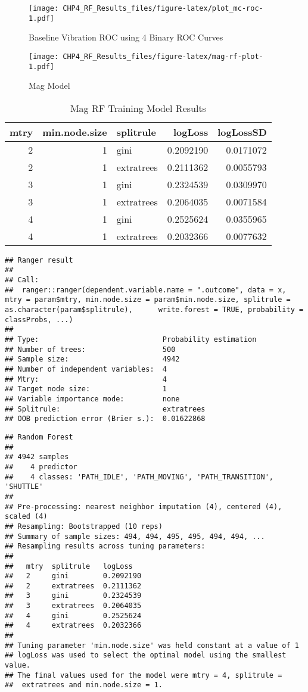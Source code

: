 \documentclass[]{article}
\begin{document}
\begin{figure}
\centering
\texttt{[image: CHP4\_RF\_Results\_files/figure-latex/plot\_mc-roc-1.pdf]}
\caption{Baseline Vibration ROC using 4 Binary ROC Curves}
\end{figure}

\begin{figure}
\centering
\texttt{[image: CHP4\_RF\_Results\_files/figure-latex/mag-rf-plot-1.pdf]}
\caption{Mag Model}
\end{figure}

\begin{table}[!h]

\caption{\label{tab:mag-rf-params}Mag RF Training Model Results}
\centering
\begin{tabular}[t]{rrlrr}
\toprule
mtry & min.node.size & splitrule & logLoss & logLossSD\\
\midrule
2 & 1 & gini & 0.2092190 & 0.0171072\\
2 & 1 & extratrees & 0.2111362 & 0.0055793\\
3 & 1 & gini & 0.2324539 & 0.0309970\\
3 & 1 & extratrees & 0.2064035 & 0.0071584\\
4 & 1 & gini & 0.2525624 & 0.0355965\\
4 & 1 & extratrees & 0.2032366 & 0.0077632\\
\bottomrule
\end{tabular}
\end{table}

\begin{verbatim}
## Ranger result
## 
## Call:
##  ranger::ranger(dependent.variable.name = ".outcome", data = x,      mtry = param$mtry, min.node.size = param$min.node.size, splitrule = as.character(param$splitrule),      write.forest = TRUE, probability = classProbs, ...) 
## 
## Type:                             Probability estimation 
## Number of trees:                  500 
## Sample size:                      4942 
## Number of independent variables:  4 
## Mtry:                             4 
## Target node size:                 1 
## Variable importance mode:         none 
## Splitrule:                        extratrees 
## OOB prediction error (Brier s.):  0.01622868
\end{verbatim}

\begin{verbatim}
## Random Forest 
## 
## 4942 samples
##    4 predictor
##    4 classes: 'PATH_IDLE', 'PATH_MOVING', 'PATH_TRANSITION', 'SHUTTLE' 
## 
## Pre-processing: nearest neighbor imputation (4), centered (4), scaled (4) 
## Resampling: Bootstrapped (10 reps) 
## Summary of sample sizes: 494, 494, 495, 495, 494, 494, ... 
## Resampling results across tuning parameters:
## 
##   mtry  splitrule   logLoss  
##   2     gini        0.2092190
##   2     extratrees  0.2111362
##   3     gini        0.2324539
##   3     extratrees  0.2064035
##   4     gini        0.2525624
##   4     extratrees  0.2032366
## 
## Tuning parameter 'min.node.size' was held constant at a value of 1
## logLoss was used to select the optimal model using the smallest value.
## The final values used for the model were mtry = 4, splitrule =
##  extratrees and min.node.size = 1.
\end{verbatim}
\end{document}
